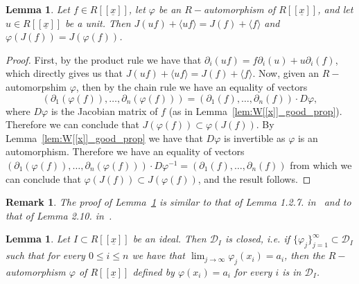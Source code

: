 \documentclass{article}
\newtheorem{lemma}[theorem]{Lemma}
\newtheorem{remark}[theorem]{Remark}
\numberwithin{theorem}{section}
\begin{document}
\begin{lemma}\label{lem:aut_der}
    Let $f \in R[[\underline{x}]]$, let $\varphi$ be an $R-$automorphism of $R[[\underline{x}]]$, and let $u \in R[[\underline{x}]]$ be a unit. Then $J(uf)+\langle uf \rangle = J(f)+\langle f \rangle$ and $\varphi(J(f))=J(\varphi(f))$. 
\end{lemma}

\begin{proof}
    First, by the product rule we have that $\partial_i(uf)=f\partial_i(u)+u\partial_i(f)$, which directly gives us that $J(uf)+\langle uf \rangle = J(f)+\langle f \rangle$. Now, given an $R-$automorpshim $\varphi$, then by the chain rule we have an equality of vectors
    \begin{equation*}
        (\partial_1(\varphi(f)), \dots, \partial_n(\varphi(f)))= (\partial_1(f), \dots, \partial_n(f)) \cdot D\varphi,
    \end{equation*}
    where $D\varphi$ is the Jacobian matrix of $f$ (as in Lemma~\ref{lem:W[[x]]_good_prop}). Therefore we can conclude that $J(\varphi(f)) \subset \varphi(J(f))$. By Lemma~\ref{lem:W[[x]]_good_prop} we have that $D\varphi$ is invertible as $\varphi$ is an automorphism. Therefore we have an equality of vectors $ (\partial_1(\varphi(f)), \dots, \partial_n(\varphi(f))) \cdot D\varphi^{-1}= (\partial_1(f), \dots, \partial_n(f))$ from which we can conclude that $\varphi(J(f)) \subset J(\varphi(f))$, and the result follows. 
\end{proof}

\begin{remark}
    \textup{The proof of Lemma~\ref{lem:aut_der} is similar to that of Lemma 1.2.7. in~\cite{boubakri2009hypersurface} and to that of Lemma 2.10. in~\cite{greuel2007introduction}. }
\end{remark}

\begin{lemma}\label{lem:D_Iclosed}
    Let $I \subset R[[\underline{x}]]$ be an ideal. Then $\mathcal{D}_I$ is closed, i.e. if $\{\varphi_j\}_{j=1}^\infty \subset \mathcal{D}_I$ such that for every $0 \leq i \leq n$ we have that $\lim_{j \to \infty} \varphi_j(x_i)=a_i$, then the $R-$automorphism $\varphi$ of $R[[\underline{x}]]$ defined by $\varphi(x_i)=a_i$ for every $i$ is in $\mathcal{D}_I$. 
\end{lemma}
\end{document}
